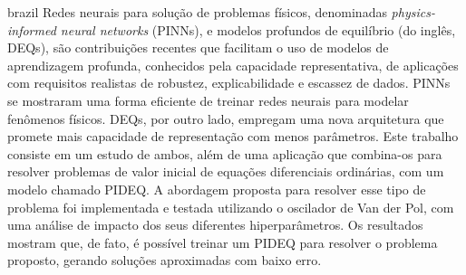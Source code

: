 \begin{resumo}[Resumo]
	\SingleSpacing
	\begin{otherlanguage*}{brazil}
	    Redes neurais para solução de problemas físicos, denominadas \emph{physics-informed neural networks} (PINNs), e modelos profundos de equilíbrio (do inglês, DEQs), são contribuições recentes que facilitam o uso de modelos de aprendizagem profunda, conhecidos pela capacidade representativa, de aplicações com requisitos realistas de robustez, explicabilidade e escassez de dados.
	    PINNs se mostraram uma forma eficiente de treinar redes neurais para modelar fenômenos físicos.
	    DEQs, por outro lado, empregam uma nova arquitetura que promete mais capacidade de representação com menos parâmetros.
	    Este trabalho consiste em um estudo de ambos, além de uma aplicação que combina-os para resolver problemas de valor inicial de equações diferenciais ordinárias, com um modelo chamado PIDEQ.
	    A abordagem proposta para resolver esse tipo de problema foi implementada e testada utilizando o oscilador de Van der Pol, com uma análise de impacto dos seus diferentes hiperparâmetros.
	    Os resultados mostram que, de fato, é possível treinar um PIDEQ para resolver o problema proposto, gerando soluções aproximadas com baixo erro.
		

	\end{otherlanguage*}
\end{resumo}

% 
%
%  

